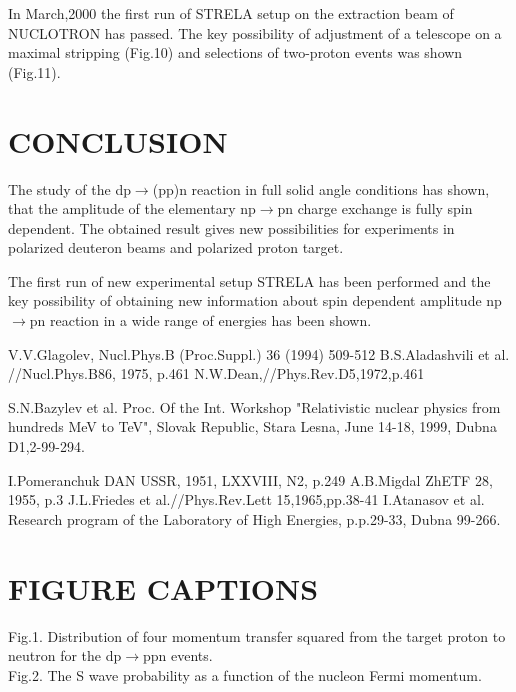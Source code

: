 \documentclass[a4paper,12pt]{article}
\begin{document}
    In March,2000 the first run of STRELA setup on the extraction beam of NUCLOTRON
    has passed.
    The key possibility of adjustment of a telescope on a maximal stripping (Fig.10)
    and selections of two-proton events was shown (Fig.11).

    \section{CONCLUSION}
    \indent
    The study of the dp$\to$(pp)n reaction in full solid angle conditions
    has shown, that the amplitude of the elementary np$\to$pn charge exchange
    is fully spin dependent.
    The obtained result gives  new possibilities for experiments in polarized
    deuteron beams and polarized proton target.

    The first run of new experimental setup STRELA has been performed
    and the key possibility
    of obtaining new information about spin dependent amplitude np$\to$pn
    reaction in a wide range of energies has been shown.

    \begin{thebibliography}{99}
     V.V.Glagolev, Nucl.Phys.B (Proc.Suppl.) 36 (1994) 509-512
     B.S.Aladashvili et al. //Nucl.Phys.B86, 1975, p.461
     N.W.Dean,//Phys.Rev.D5,1972,p.461

     S.N.Bazylev et al. Proc. Of the Int. Workshop
      "Relativistic nuclear physics from hundreds MeV to TeV", Slovak Republic,
      Stara Lesna, June 14-18, 1999, Dubna D1,2-99-294.

     I.Pomeranchuk DAN USSR, 1951, LXXVIII, N2, p.249
       A.B.Migdal ZhETF 28, 1955, p.3
     J.L.Friedes et al.//Phys.Rev.Lett 15,1965,pp.38-41
     I.Atanasov et al. Research program of the Laboratory of
      High Energies, p.p.29-33, Dubna 99-266.

    \end{thebibliography}


    \section{FIGURE CAPTIONS}

    \noindent
    Fig.1. Distribution of four momentum transfer squared from the target proton
    to neutron for the dp$\to$ppn events. \\

    \noindent
    Fig.2. The S wave probability as a function of the nucleon Fermi momentum. \\
\end{document}
